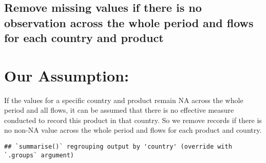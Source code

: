 \documentclass[
]{article}
\newenvironment{Shaded}{\begin{snugshade}}{\end{snugshade}}
\newcommand{\CommentTok}[1]{\textcolor[rgb]{0.56,0.35,0.01}{\textit{#1}}}
\newcommand{\ControlFlowTok}[1]{\textcolor[rgb]{0.13,0.29,0.53}{\textbf{#1}}}
\newcommand{\DataTypeTok}[1]{\textcolor[rgb]{0.13,0.29,0.53}{#1}}
\newcommand{\KeywordTok}[1]{\textcolor[rgb]{0.13,0.29,0.53}{\textbf{#1}}}
\newcommand{\NormalTok}[1]{#1}
\newcommand{\OperatorTok}[1]{\textcolor[rgb]{0.81,0.36,0.00}{\textbf{#1}}}
\newcommand{\OtherTok}[1]{\textcolor[rgb]{0.56,0.35,0.01}{#1}}
\newcommand{\StringTok}[1]{\textcolor[rgb]{0.31,0.60,0.02}{#1}}
\begin{document}
\hypertarget{remove-missing-values-if-there-is-no-observation-across-the-whole-period-and-flows-for-each-country-and-product}{%
\subsection{Remove missing values if there is no observation across the
whole period and flows for each country and
product}\label{remove-missing-values-if-there-is-no-observation-across-the-whole-period-and-flows-for-each-country-and-product}}

\hypertarget{our-assumption}{%
\section{Our Assumption:}\label{our-assumption}}

If the values for a specific country and product remain NA across the
whole period and all flows, it can be assumed that there is no effective
measure conducted to record this product in that country. So we remove
records if there is no non-NA value across the whole period and flows
for each product and country.

\begin{Shaded}
\end{Shaded}

\begin{verbatim}
## `summarise()` regrouping output by 'country' (override with `.groups` argument)
\end{verbatim}
\end{document}
